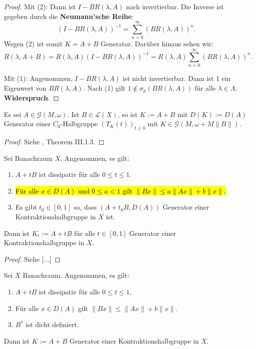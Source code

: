 \begin{proof}
Mit (2): Dann ist  $I-BR(\lambda, A)$ nach \Cref{} invertierbar. Die Inverse ist gegeben durch die \textbf{Neumann'sche Reihe}:
\begin{equation*}
(I-BR(\lambda, A))^{-1}=\sum_{n=0}^\infty (BR(\lambda, A))^n.
\end{equation*}
Wegen \Cref{} (2) ist somit $K=A+B$ Generator. Darüber hinaus sehen wir:
\begin{equation*}
R(\lambda, A+B)=R(\lambda, A)(I-BR(\lambda, A))^{-1} =R(\lambda, A)\sum_{n=0}^\infty (BR(\lambda, A))^n.
\end{equation*}

\par
Mit (1): Angenommen, $I-BR(\lambda, A)$ ist nicht invertierbar. Dann ist $1$ ein Eigenwert von $BR(\lambda, A)$. Nach \Cref{} (1) gilt $1\not\in\sigma_p(BR(\lambda, A))$ für alle $\lambda\in\Lambda$. \textbf{Widerspruch}.
\end{proof}

\begin{fsatz}
Es sei $A\in\mathcal G(M,\omega)$. Ist $B\in\mathcal L(X)$, so ist $K:=A+B$ mit $D(K):=D(A)$ Generator einer $C_0$-Halbgruppe $(T_K(t))_{t\geq0}$ mit $K\in\mathcal G(M, \omega +M\|B\|)$. 
\end{fsatz}

\begin{proof}
Siehe \cite{engel_nagel_2006}, Theorem III.1.3.
\end{proof}

\begin{satz}
Sei Banachraum $X$. Angenommen, es gilt:
\begin{enumerate}
\item $A+tB$ ist dissipativ für alle $0\leq t\leq 1$.
\item \hl{Für alle $x\in D(A)$ und $0\leq a< 1$ gilt $\|Bx\|\leq a\|Ax\| + b\|x\|$.}
\item Es gibt $t_0\in[0,1]$ so, dass $(A+t_0B, D(A))$ Generator einer Kontraktionshalbgruppe in $X$ ist.
\end{enumerate}
Dann ist $K_t:=A+tB$ für alle $t\in[0,1]$ Generator einer Kontraktionshalbgruppe in $X$.
\end{satz}

\begin{proof}
Siehe \cite{} [...]
\end{proof}

\begin{satz}
Sei $X$ Banachraum. Angenommen, es gilt:
\begin{enumerate}
\item $A+tB$ ist dissipativ für alle $0\leq t\leq 1$.
\item Für alle $x\in D(A)$ gilt $\|Bx\|\leq \|Ax\| + b\|x\|$.
\item $B^*$ ist dicht definiert.
\end{enumerate}
Dann ist $K:=\overline{A+B}$ Generator einer Kontraktionshalbgruppe in $X$.
\end{satz}

